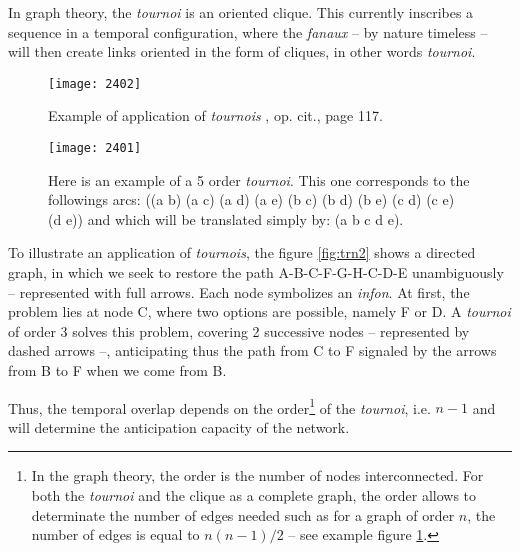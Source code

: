 In graph theory, the \textit{tournoi} is an oriented clique. This currently inscribes a sequence in a temporal configuration, where the \textit{fanaux} -- by nature timeless -- will then create links oriented in the form of cliques, in other words \textit{tournoi}.

\begin{figure}[htbp]
    \centering
    \begin{minipage}{0.5\textwidth}
        \centering
                \texttt{[image: 2402]} %
        \caption{Example of application of \textit{tournois} \citep{bg1}, op. cit., page 117.}
        \label{fig:trn2}
            \end{minipage}\hfill
    \begin{minipage}{0.45\textwidth}
        \centering
\texttt{[image: 2401]} %
        \caption{Here is an example of a 5 order \textit{tournoi}. This one corresponds to the followings arcs: ((a b) (a c) (a d) (a e) (b c) (b d) (b e) (c d) (c e) (d e)) and which will be translated simply by: (a b c d e).}
      \label{fig:trn1}

    \end{minipage}
\end{figure}

\bigskip

To illustrate an application of \textit{tournois}, the figure \ref{fig:trn2} shows a directed graph, in which we seek to restore the path A-B-C-F-G-H-C-D-E unambiguously -- represented with full arrows. Each node symbolizes an \textit{infon}. At first, the problem lies at node C, where two options are possible, namely F or D. A \textit{tournoi} of order 3 solves this problem, covering 2 successive nodes -- represented by dashed arrows --, anticipating thus the path from C to F signaled by the arrows from B to F when we come from B.

\bigskip

Thus, the temporal overlap depends on the order\footnote{In the graph theory, the order is the number of nodes interconnected. For both the \textit{tournoi} and the clique as a complete graph, the order allows to determinate the number of edges needed such as for a graph of order $n$, the number of edges is equal to $n(n-1)/2$ -- see example figure \ref{fig:trn1}.} of the \textit{tournoi}, i.e. $n-1$ and will determine the anticipation capacity of the network.